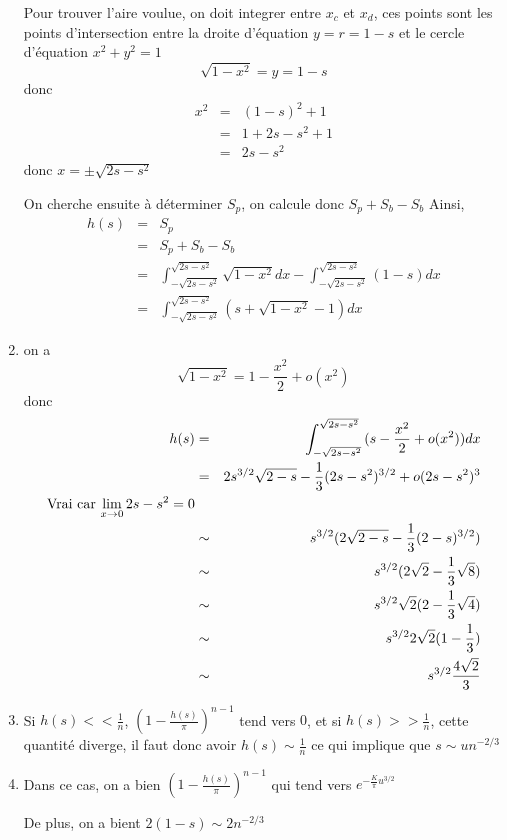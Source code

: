 \documentclass[a4paper,12pt,twoside]{article}
\begin{document}
\begin{enumerate}
			Pour trouver l'aire voulue, on doit integrer entre $x_c$ et $x_d$, ces points sont les points d'intersection entre la droite d'équation $y = r = 1 - s$ et le cercle d'équation $x^2 + y^2 = 1$
			$$ \sqrt{1 - x^2} = y = 1 - s $$ donc 
			\begin{eqnarray}
				x^2	&=& (1 - s)^2 + 1\\
					&=& 1 + 2s - s^2 + 1\\
					&=& 2s - s^2
			\end{eqnarray} 
			donc $x = \pm \sqrt{2s - s^2}$

			On cherche ensuite à déterminer $S_p$, on calcule donc $S_p + S_b - S_b$
			Ainsi, \begin{eqnarray}
				h(s)	&=& S_p \\
					&=& S_p + S_b - S_b \\
					&=& \int^{\sqrt{2s - s^2}}_{-\sqrt{2s - s^2}}{\sqrt{1-x^2}dx} - \int^{\sqrt{2s - s^2}}_{-\sqrt{2s - s^2}}{(1 - s) dx} \\
					&=& \int^{\sqrt{2s - s^2}}_{-\sqrt{2s - s^2}}{(s + \sqrt{1-x^2} - 1) dx}
			\end{eqnarray}

		\item on a $$\sqrt{1 - x^2} = 1 - \frac{x^2}{2} + o(x^2)$$
		donc
		\begin{eqnarray}
			h(s)	&=& \int^{\sqrt{2s - s^2}}_{-\sqrt{2s - s^2}}{(s - \frac{x^2}{2} + o(x^2)) dx} \\
				&=& 2s^{3/2}\sqrt{2-s} - \frac{1}{3}(2s - s^2)^{3/2} + o(2s-s^2)^3 \\\text{Vrai car $ \lim_{x \to 0} 2s - s^2 = 0$}\\ %
				&\sim& s^{3/2} (2\sqrt{2-s} - \frac{1}{3}(2 - s)^{3/2}) \\
				&\sim& s^{3/2} (2\sqrt{2} - \frac{1}{3}\sqrt{8}) \\
				&\sim& s^{3/2} \sqrt{2}(2 - \frac{1}{3}\sqrt{4}) \\
				&\sim& s^{3/2} 2\sqrt{2}(1 - \frac{1}{3}) \\
				&\sim& s^{3/2} \frac{4\sqrt{2}}{3} \\
		\end{eqnarray}
		\item	Si $h(s) << \frac{1}{n}$, $\left(1 - \frac{h(s)}{\pi}\right)^{n-1}$ tend vers $0$, et si $h(s) >> \frac{1}{n}$, cette quantité diverge, il faut donc avoir $h(s) \sim \frac{1}{n}$ ce qui implique que $s \sim un^{-2/3}$%

		\item Dans ce cas, on a bien $\left(1 - \frac{h(s)}{\pi}\right)^{n-1}$ qui tend vers $e^{-\frac{K}{\pi}u^{3/2}}$

		De plus, on a bient $2(1-s) \sim 2n^{-2/3}$

		\end{enumerate}
\end{document}

